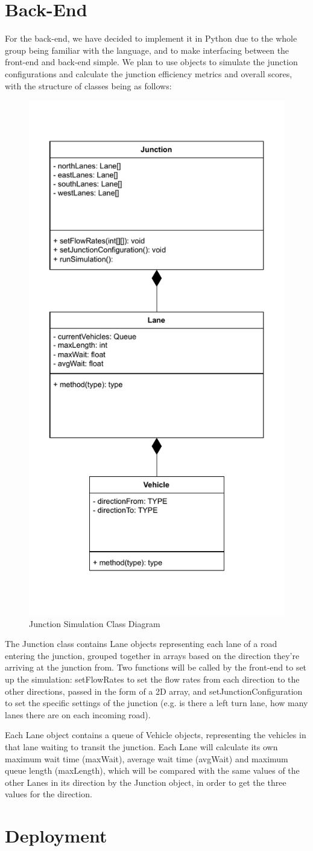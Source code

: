 \documentclass{article}
\begin{document}
\section{Back-End}
For the back-end, we have decided to implement it in Python due to the whole group being familiar with the language, and to make 
interfacing between the front-end and back-end simple. We plan to use objects to simulate the junction configurations and calculate 
the junction efficiency metrics and overall scores, with the structure of classes being as follows:
\begin{figure}[H]
    \centering
    \includegraphics[width=0.5\linewidth]{JunctionSimulationClassDiagram.drawio.pdf}
    \caption{Junction Simulation Class Diagram}
    \label{class diagram}
\end{figure}
The Junction class contains Lane objects representing each lane of a road entering the junction, grouped together in arrays based on 
the direction they’re arriving at the junction from. Two functions will be called by the front-end to set up the simulation: 
setFlowRates to set the flow rates from each direction to the other directions, passed in the form of a 2D array, and 
setJunctionConfiguration to set the specific settings of the junction (e.g. is there a left turn lane, how many lanes there are on 
each incoming road).

Each Lane object contains a queue of Vehicle objects, representing the vehicles in that lane waiting to transit the junction. Each Lane will calculate its own maximum wait time (maxWait), average wait time (avgWait) and maximum queue length (maxLength), which will be compared with the same values of the other Lanes in its direction by the Junction object, in order to get the three values for the direction. 


\section{Deployment}
\end{document}
